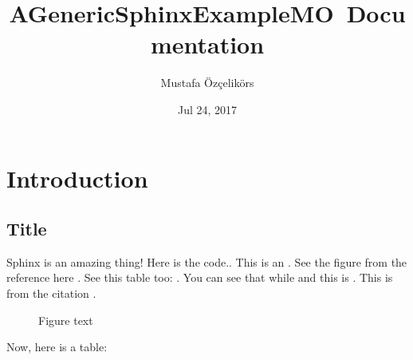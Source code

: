 \documentclass[letterpaper,10pt,english]{sphinxmanual}
\title{AGenericSphinxExampleMO\ Documentation}
\date{Jul 24, 2017}
\author{Mustafa Özçelikörs}
\let\sphinxpxdimen\pdfpxdimen\else\newdimen\sphinxpxdimen
\begin{document}
\maketitle
\sphinxtableofcontents
{}\label{\detokenize{index::doc}}



\chapter{Introduction}
\label{\detokenize{intro:introduction}}\label{\detokenize{intro:welcome-to-a-generic-sphinx-example-documentation}}\label{\detokenize{intro::doc}}

\section{Title}
\label{\detokenize{intro:title}}
Sphinx is an amazing thing! Here is the code.. This is an . See the figure from the reference here {\hyperref[\detokenize{intro:reference-label}]{}}. See this table too: {\hyperref[\detokenize{intro:reference-label2}]{}}. You can see that  while  and this is . This is from the citation \label{\detokenize{intro:id1}}{\hyperref[\detokenize{intro:citation}]{\sphinxcrossref{{[}CITATION{]}}}}.

\begin{sphinxVerbatim}[commandchars=\\\{\},numbers=left,firstnumber=1,stepnumber=1]
 
 
     
\end{sphinxVerbatim}

\begin{figure}[htbp]
\centering
\capstart

\noindent\sphinxincludegraphics[width=200\sphinxpxdimen,height=100\sphinxpxdimen]{{stars}.jpg}
\caption{Figure text}\label{\detokenize{intro:reference-label}}\label{\detokenize{intro:id2}}\end{figure}

Now, here is a table:
\end{document}
